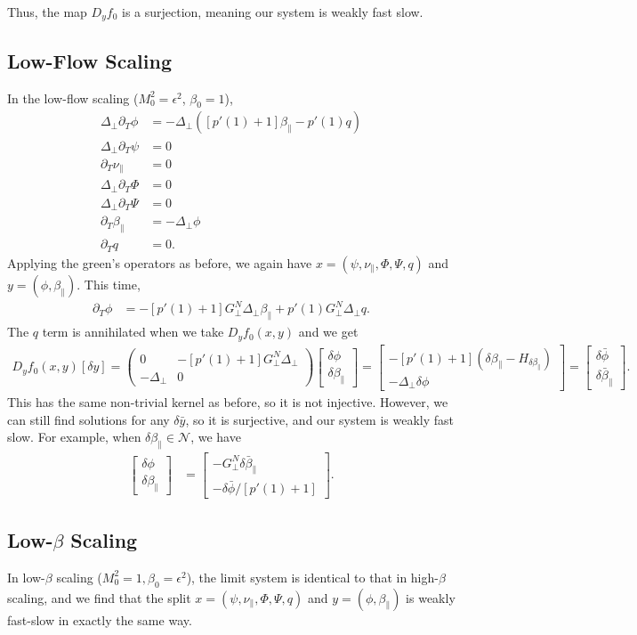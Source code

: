 \documentclass{article}
\newcommand{\para}{\parallel}
\newcommand{\ep}{\epsilon}
\newcommand{\lap}{\Delta_\perp}
\newcommand{\p}{\partial}
\newcommand{\GN}{G_\perp^N}
\newcommand{\pth} [1] {\left( #1 \right) }
\newcommand{\bmat} [1] {\begin{bmatrix} #1 \end{bmatrix}}
\newcommand{\pmat} [1] {\begin{pmatrix} #1 \end{pmatrix}}
\begin{document}
Thus, the map $D_yf_0$ is a surjection, meaning our system is weakly fast slow. 


\subsection{Low-Flow Scaling} \label{lowflow}
In the low-flow scaling ($M_0^2 = \ep^2$, $\beta_0=1$), 
\begin{align}
    \lap\p_T\phi &= -\lap\pth{[p'(1)+1] \beta_\para - p'(1) q} \\ 
    \lap \p_T\psi &= 0 \\ 
    \p_T\nu_\para &= 0 \\ 
    \lap \p_T\Phi &= 0 \\ 
    \lap \p_T\Psi &= 0 \\ 
    \p_T\beta_\para &= -\lap\phi \\ 
    \p_Tq &= 0.
\end{align}
Applying the green's operators as before, we again have $x=(\psi, \nu_\para, \Phi, \Psi, q)$ and $y=(\phi, \beta_\para)$. This time,  
\begin{align}
    \p_T\phi &= -[p'(1)+1] \GN\lap\beta_\para + p'(1) \GN\lap q.
\end{align}
The $q$ term is annihilated when we take $D_yf_0(x,y)$ and we get 
\begin{align}
    D_yf_0(x,y)[\delta y] = \pmat{0 & -[p'(1)+1] \GN \lap \\ -\lap & 0} \bmat{\delta \phi \\ \delta \beta_\para} = \bmat{-[p'(1)+1] \pth{\delta\beta_\para - H_{\delta\beta_\para}} \\ -\lap\delta\phi} = \bmat{\delta \bar{\phi} \\ \delta \bar{\beta}_\para}. 
\end{align}
This has the same non-trivial kernel as before, so it is not injective. However, we can still find solutions for any $\delta\bar{y}$, so it is surjective, and our system is weakly fast slow. For example, when $\delta\beta_\para\in\mathcal{N}$, we have 
\begin{align}
    \bmat{\delta\phi \\ \delta\beta_\para} &= \bmat{-\GN \delta\bar{\beta}_\para \\ -\delta\bar{\phi} / [p'(1)+1]}. 
\end{align}


\subsection{Low-$\beta$ Scaling} \label{lowflow}
In low-$\beta$ scaling ($M_0^2 = 1, \beta_0 = \ep^2$), the limit system is identical to that in high-$\beta$ scaling, and we find that the split $x=(\psi, \nu_\para, \Phi, \Psi, q)$ and $y=(\phi, \beta_\para)$ is weakly fast-slow in exactly the same way. 
\end{document}
